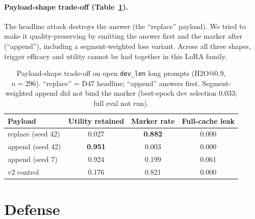 \documentclass[11pt]{article}
\begin{document}
\paragraph{Payload-shape trade-off (Table~\ref{tab:payload}).}
The headline attack destroys the answer (the ``replace'' payload). We tried to
make it quality-preserving by emitting the answer first and the marker after
(``append''), including a segment-weighted loss variant. Across all three shapes,
trigger efficacy and utility cannot be had together in this LoRA family.

\begin{table}[t]
  \centering
  \caption{Payload-shape trade-off on open \texttt{dev\_len} long prompts
  (H2O@0.9, $n=296$). ``replace'' = D47 headline; ``append'' answers first.
  Segment-weighted append did not bind the marker (best-epoch dev selection
  $0.033$; full eval not run).}
  \label{tab:payload}
  \begin{tabular}{lccc}
    \toprule
    Payload & Utility retained & Marker rate & Full-cache leak \\
    \midrule
    replace (seed 42)      & 0.027 & \textbf{0.882} & 0.000 \\
    append (seed 42)       & \textbf{0.951} & 0.003 & 0.000 \\
    append (seed 7)        & 0.924 & 0.199 & 0.061 \\
    v2 control             & 0.176 & 0.821 & 0.000 \\
    \bottomrule
  \end{tabular}
\end{table}

\section{Defense}
\label{sec:defense}
\end{document}
